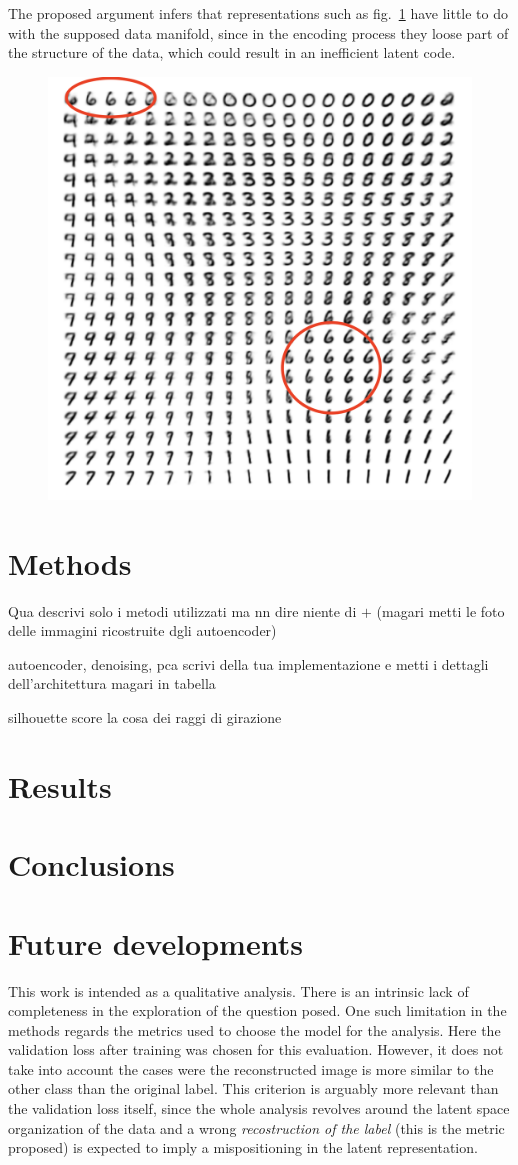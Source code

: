 \documentclass[twocolumn,gsifonts,twoside]{gsipaper}
\begin{document}
The proposed argument infers that representations such as fig.~\ref{fig:vae} have little to do with the supposed data manifold, since in the encoding process they loose part of the structure of the data, which could result in an inefficient latent code.

\begin{figure}
  \centering
  \includegraphics[width=.6\linewidth]{image_from_vae.png}
  \caption{\cite{Kingma2022}} %
  \label{fig:vae}
\end{figure}


\section{Methods}
Qua descrivi solo i metodi utilizzati ma nn dire niente di $+$
(magari metti le foto delle immagini ricostruite dgli autoencoder)

autoencoder, denoising, pca
scrivi della tua implementazione e metti i dettagli dell'architettura magari in tabella

silhouette score
la cosa dei raggi di girazione


\section{Results}


\section{Conclusions}


\section{Future developments}
This work is intended as a qualitative analysis. There is an intrinsic lack of completeness in the exploration of the question posed. One such limitation in the methods regards the metrics used to choose the model for the analysis. Here the validation loss after training was chosen for this evaluation. However, it does not take into account the cases were the reconstructed image is more similar to the other class than the original label. This criterion is arguably more relevant than the validation loss itself, since the whole analysis revolves around the latent space organization of the data and a wrong \emph{recostruction of the label} (this is the metric proposed) is expected to imply a mispositioning in the latent representation.
\end{document}
